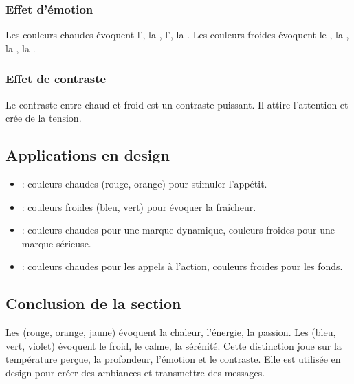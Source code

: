 \subsubsection{Effet d'émotion}

Les couleurs chaudes évoquent l', la , l', la . Les couleurs froides évoquent le , la , la , la .

\subsubsection{Effet de contraste}

Le contraste entre chaud et froid est un contraste puissant. Il attire l'attention et crée de la tension.

\subsection{Applications en design}

\begin{itemize}
    \item {} : couleurs chaudes (rouge, orange) pour stimuler l'appétit.
    \item {} : couleurs froides (bleu, vert) pour évoquer la fraîcheur.
    \item {} : couleurs chaudes pour une marque dynamique, couleurs froides pour une marque sérieuse.
    \item {} : couleurs chaudes pour les appels à l'action, couleurs froides pour les fonds.
\end{itemize}

\subsection*{Conclusion de la section}

\begin{retenir}
Les  (rouge, orange, jaune) évoquent la chaleur, l'énergie, la passion. Les  (bleu, vert, violet) évoquent le froid, le calme, la sérénité. Cette distinction joue sur la température perçue, la profondeur, l'émotion et le contraste. Elle est utilisée en design pour créer des ambiances et transmettre des messages.
\end{retenir}

